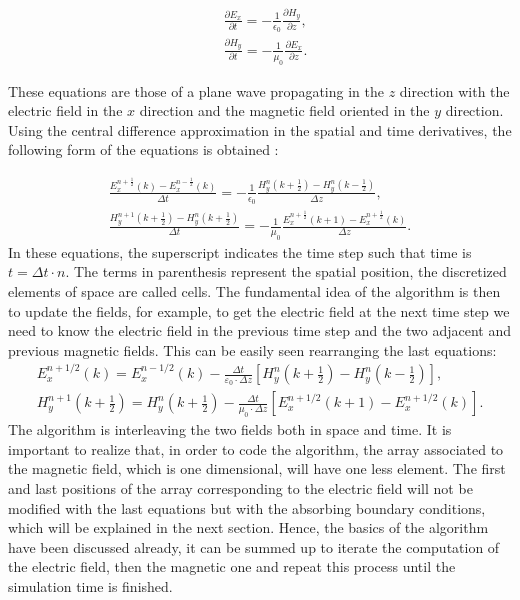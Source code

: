 \documentclass[12pt, oneside]{book}
\begin{document}
\begin{align}
& \frac{\partial E_x}{\partial t}=-\frac{1}{\epsilon_0}  \frac{\partial H_y}{\partial z}, \\
& \frac{\partial H_y}{\partial t}=-\frac{1}{\mu_0} \frac{\partial E_x}{\partial z}.
\end{align}

\noindent These equations are those of a plane wave propagating in the $z$ direction with the electric field in the $x$ direction and the magnetic field oriented in the $y$ direction. Using the central difference approximation in the spatial and time derivatives, the following form of the equations is obtained \cite{yee1966numerical,taflove2005computational}:

\begin{align}
 \frac{E_x^{n+\frac{1}{2}}(k)-E_x^{n-\frac{1}{2}}(k)}{\Delta t}=-\frac{1}{\epsilon_0}\frac{H_y^n \left(k+\frac{1}{2}\right) - H_y^n\left(k-\frac{1}{2}\right)}{\Delta z}, \\
\frac{H_y^{n+1} \left(k+\frac{1}{2}\right) -H_y^{n}\left( k +\frac{1}{2}\right)}{\Delta t}=-\frac{1}{\mu_0}\frac{E_x^{n+\frac{1}{2}} \left(k+1\right) - E_x^{n+\frac{1}{2}}\left(k\right)}{\Delta z}.
\end{align}
In these equations, the superscript indicates the time step such that time is $t=\Delta t \cdot n$. The terms in parenthesis represent the spatial position, the discretized elements of space are called cells. The fundamental idea of the algorithm is then to update the fields, for example, to get the electric field at the next time step we need to know the electric field in the previous time step and the two adjacent and previous magnetic fields. This can be easily seen rearranging the last equations:
\begin{equation}\label{updateequationseandh}
\begin{gathered}
E_{x}^{n+1 / 2}(k)=E_{x}^{n-1 / 2}(k)-\frac{\Delta t}{\varepsilon_{0} \cdot \Delta z}\left[H_{y}^{n}\left(k+\frac{1}{2}\right)-H_{y}^{n}\left(k-\frac{1}{2}\right)\right], \\
H_{y}^{n+1}\left(k+\frac{1}{2}\right)=H_{y}^{n}\left(k+\frac{1}{2}\right)-\frac{\Delta t}{\mu_{0} \cdot \Delta z}\left[E_{x}^{n+1 / 2}(k+1)-E_{x}^{n+1 / 2}(k)\right].
\end{gathered}
\end{equation}
The algorithm is interleaving the two fields both in space and time. It is important to realize that, in order to code the algorithm, the array associated to the magnetic field, which is one dimensional, will have one less element. The first and last positions of the array corresponding to the electric field will not be modified with the last equations but with the absorbing boundary conditions, which will be explained in the next section. Hence, the basics of the algorithm have been discussed already, it can be summed up to iterate the computation of the electric field, then the magnetic one and repeat this process until the simulation time is finished. \\
\end{document}
